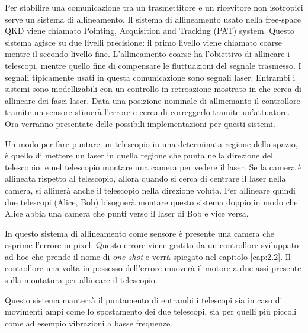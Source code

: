 Per stabilire una comunicazione tra un trasmettitore e un ricevitore non isotropici serve un sistema di allineamento. Il sistema di allineamento usato nella free-space QKD viene chiamato Pointing, Acquisition and Tracking (PAT) system. Questo sistema agisce su due livelli precisione: il primo livello viene chiamato coarse mentre il secondo livello fine. L'allineamento coarse ha l'obiettivo di allineare i telescopi, mentre quello fine di compensare le fluttuazioni del segnale trasmesso. I segnali tipicamente usati in questa comunicazione sono segnali laser. Entrambi i sistemi sono modellizabili con un controllo in retroazione mostrato in  che cerca di allineare dei fasci laser. Data una posizione nominale di allinemanto il controllore tramite un sensore stimerà l'errore e cerca di correggerlo tramite un'attuatore. Ora verranno presentate delle possibili implementazioni per questi sistemi.

Un modo per fare puntare un telescopio in una determinata regione dello spazio, è quello di mettere un laser in quella regione che punta nella direzione del telescopio, e nel telescopio montare una camera per vedere il laser. Se la camera è allineata rispetto al telescopio, allora quando si cerca di centrare il laser nella camera, si allinerà anche il telescopio nella direzione voluta. Per allineare quindi due telescopi (Alice, Bob) bisognerà montare questo sistema doppio in modo che Alice abbia una camera che punti verso il laser di Bob e vice versa.

In questo sistema di allineamento come sensore è presente una camera che esprime l'errore in pixel. Questo errore viene gestito da un controllore sviluppato ad-hoc che prende il nome di \textit{one shot} e verrà spiegato nel capitolo \ref{cap:2.2}. Il controllore una volta in possesso dell'errore muoverà il motore a due assi presente sulla montatura per allineare il telescopio.

Questo sistema manterrà il puntamento di entrambi i telescopi sia in caso di movimenti ampi come lo spostamento dei due telescopi, sia per quelli più piccoli come ad esempio vibrazioni a basse frequenze.



